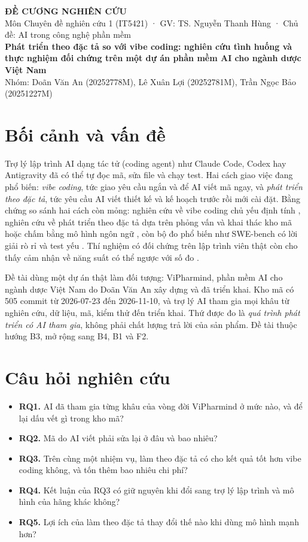 \documentclass[11pt,a4paper]{article}
\begin{document}
\begin{center}
{\large\bfseries ĐỀ CƯƠNG NGHIÊN CỨU}\\[2pt]
Môn Chuyên đề nghiên cứu 1 (IT5421) · GV: TS. Nguyễn Thanh Hùng · Chủ đề: AI trong công nghệ phần mềm\\[4pt]
{\bfseries Phát triển theo đặc tả so với vibe coding: nghiên cứu tình huống và thực nghiệm đối chứng
trên một dự án phần mềm AI cho ngành dược Việt Nam}\\[4pt]
Nhóm: Doãn Văn An (20252778M), Lê Xuân Lợi (20252781M), Trần Ngọc Bảo (20251227M)
\end{center}

\section{Bối cảnh và vấn đề}
Trợ lý lập trình AI dạng tác tử (coding agent) như Claude Code, Codex hay Antigravity đã có thể tự đọc
mã, sửa file và chạy test. Hai cách giao việc đang phổ biến: \emph{vibe coding}, tức giao yêu cầu ngắn
và để AI viết mã ngay, và \emph{phát triển theo đặc tả}, tức yêu cầu AI viết thiết kế và kế hoạch trước
rồi mới cài đặt. Bằng chứng so sánh hai cách còn mỏng: nghiên cứu về vibe coding chủ yếu định tính
\cite{chou_2025}, nghiên cứu về phát triển theo đặc tả dựa trên phỏng vấn và khai thác kho mã \cite{agarwal_2026} hoặc
chấm bằng mô hình ngôn ngữ \cite{taghavi_2026}, còn bộ đo phổ biến như SWE-bench \cite{jimenez_2024}
có lời giải rò rỉ và test yếu \cite{aleithan_2024}. Thí nghiệm có đối chứng trên lập trình viên thật
còn cho thấy cảm nhận về năng suất có thể ngược với số đo \cite{becker_2025}.

Đề tài dùng một dự án thật làm đối tượng: ViPharmind, phần mềm AI cho ngành dược Việt Nam do Doãn Văn An xây
dựng và đã triển khai. Kho mã có 505 commit từ 2026-07-23 đến 2026-11-10, và trợ lý AI tham gia mọi
khâu từ nghiên cứu, dữ liệu, mã, kiểm thử đến triển khai. Thứ được đo là \emph{quá trình phát triển có
AI tham gia}, không phải chất lượng trả lời của sản phẩm. Đề tài thuộc hướng B3, mở rộng sang B4, B1
và F2.

\section{Câu hỏi nghiên cứu}
\begin{itemize}
\item \textbf{RQ1.} AI đã tham gia từng khâu của vòng đời ViPharmind ở mức nào, và để lại dấu vết gì
trong kho mã?
\item \textbf{RQ2.} Mã do AI viết phải sửa lại ở đâu và bao nhiêu?
\item \textbf{RQ3.} Trên cùng một nhiệm vụ, làm theo đặc tả có cho kết quả tốt hơn vibe coding không,
và tốn thêm bao nhiêu chi phí?
\item \textbf{RQ4.} Kết luận của RQ3 có giữ nguyên khi đổi sang trợ lý lập trình và mô hình của hãng
khác không?
\item \textbf{RQ5.} Lợi ích của làm theo đặc tả thay đổi thế nào khi dùng mô hình mạnh hơn?
\end{itemize}
\end{document}
